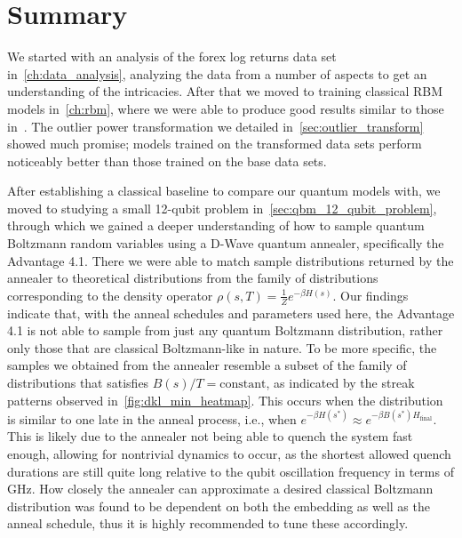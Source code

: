 \section{Summary}
We started with an analysis of the forex log returns data set in~\cref{ch:data_analysis}, analyzing the data from a number of aspects to get an understanding of the intricacies.
After that we moved to training classical RBM models in~\cref{ch:rbm}, where we were able to produce good results similar to those in~\cite{kondratyev_2019}.
The outlier power transformation we detailed in~\cref{sec:outlier_transform} showed much promise; models trained on the transformed data sets perform noticeably better than those trained on the base data sets.

After establishing a classical baseline to compare our quantum models with, we moved to studying a small 12-qubit problem in~\cref{sec:qbm_12_qubit_problem}, through which we gained a deeper understanding of how to sample quantum Boltzmann random variables using a D-Wave quantum annealer, specifically the Advantage 4.1.
There we were able to match sample distributions returned by the annealer to theoretical distributions from the family of distributions corresponding to the density operator \( \rho(s,T) = \frac{1}{Z}e^{-\beta H(s)} \).
Our findings indicate that, with the anneal schedules and parameters used here, the Advantage 4.1 is not able to sample from just any quantum Boltzmann distribution, rather only those that are classical Boltzmann-like in nature.
To be more specific, the samples we obtained from the annealer resemble a subset of the family of distributions that satisfies \( B(s) / T = \text{constant} \), as indicated by the streak patterns observed in~\cref{fig:dkl_min_heatmap}.
This occurs when the distribution is similar to one late in the anneal process, i.e., when \( e^{-\beta H(s^*)} \approx e^{-\beta B(s^*) H_\text{final}} \).
This is likely due to the annealer not being able to quench the system fast enough, allowing for nontrivial dynamics to occur, as the shortest allowed quench durations are still quite long relative to the qubit oscillation frequency in terms of \si{\giga\hertz}.
How closely the annealer can approximate a desired classical Boltzmann distribution was found to be dependent on both the embedding as well as the anneal schedule, thus it is highly recommended to tune these accordingly.


